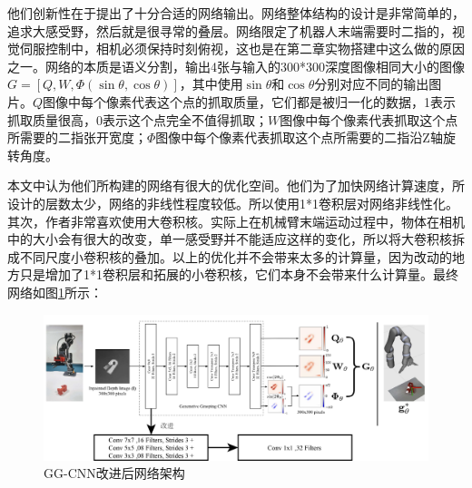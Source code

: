 \documentclass[fontset=fandol,type=bachelor,campus=harbin]{hithesisbook}
\begin{document}
他们创新性在于提出了十分合适的网络输出。网络整体结构的设计是非常简单的，追求大感受野，然后就是很寻常的叠层。网络限定了机器人末端需要时二指的，视觉伺服控制中，相机必须保持时刻俯视，这也是在第二章实物搭建中这么做的原因之一。网络的本质是语义分割，输出4张与输入的300*300深度图像相同大小的图像$G=\left[ Q,W,\varPhi \left( \sin \theta ,\cos \theta \right) \right]$，其中使用$\sin \theta$和$\cos \theta$分别对应不同的输出图片。$Q$图像中每个像素代表这个点的抓取质量，它们都是被归一化的数据，1表示抓取质量很高，0表示这个点完全不值得抓取；$W$图像中每个像素代表抓取这个点所需要的二指张开宽度；$\varPhi$图像中每个像素代表抓取这个点所需要的二指沿Z轴旋转角度。


本文中认为他们所构建的网络有很大的优化空间。他们为了加快网络计算速度，所设计的层数太少，网络的非线性程度较低。所以使用1*1卷积层对网络非线性化。其次，作者非常喜欢使用大卷积核。实际上在机械臂末端运动过程中，物体在相机中的大小会有很大的改变，单一感受野并不能适应这样的变化，所以将大卷积核拆成不同尺度小卷积核的叠加。以上的优化并不会带来太多的计算量，因为改动的地方只是增加了1*1卷积层和拓展的小卷积核，它们本身不会带来什么计算量。最终网络如图\ref{GG-CNN改进}所示：
\begin{figure}[h]
\centering
\includegraphics[width = 1.0\textwidth]{chapter3/GG-CNN改进}
\caption{GG-CNN改进后网络架构}
\label{GG-CNN改进}
\end{figure}
\end{document}
